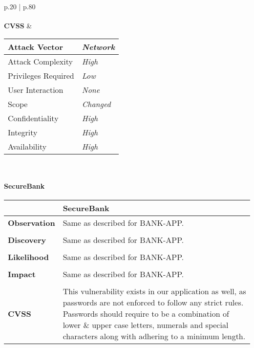 \begin{longtable*}{p{.20\textwidth} | p{.80\textwidth}}
    \\\\
    \textbf{CVSS} &
      \begin{tabular}{| l | l |}
      \hline
      Attack Vector		& \textit{Network}\\
      \hline
      Attack Complexity	& \textit{High} \\
      \hline
      Privileges Required & \textit{Low} \\
      \hline
      User Interaction	& \textit{None} \\
      \hline
      Scope		& \textit{Changed} \\
      \hline
      Confidentiality	& \textit{High} \\
      \hline
      Integrity		& \textit{High} \\
      \hline
      Availability		& \textit{High} \\
      \hline
      \end{tabular}
    \\
    \hline
\end{longtable*}
\paragraph{SecureBank} \mbox{}
\begin{longtable*}{p{.20\textwidth} | p{.80\textwidth}}
    \hline
    & \textbf{SecureBank} \\
    \hline
    \textbf{Observation} &
       Same as described for BANK-APP.
    \\\\
    \textbf{Discovery} &
    Same as described for BANK-APP.
    \\\\
    \textbf{Likelihood} &
        Same as described for BANK-APP.
    \\\\
    \textbf{Impact} &
        Same as described for BANK-APP.
    \\\\
    \textbf{CVSS} &
        This vulnerability exists in our application as well, as passwords are not enforced to follow any strict rules. Passwords should require to be a combination of lower \& upper case letters, numerals and special characters along with adhering to a minimum length.
    \\
    \hline
\end{longtable*}
\clearpage